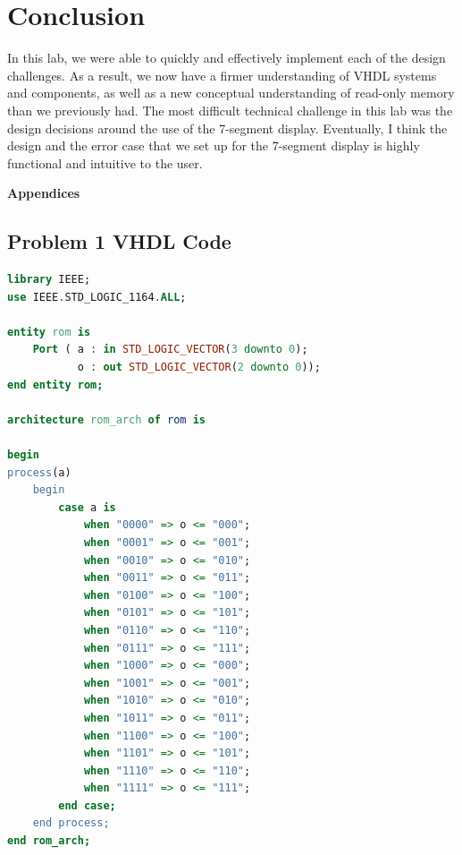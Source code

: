 \documentclass[11pt]{article}
\begin{document}
\section{Conclusion}
In this lab, we were able to quickly and effectively implement each of the design challenges. As a result, we now have a firmer understanding of VHDL systems and components, as well as a new conceptual understanding of read-only memory than we previously had. The most difficult technical challenge in this lab was the design decisions around the use of the 7-segment display. Eventually, I think the design and the error case that we set up for the 7-segment display is highly functional and intuitive to the user.

\pagebreak

\textbf{Appendices}

\begin{appendices}

\section{Problem 1 VHDL Code}

\begin{lstlisting}[language=VHDL]
library IEEE;
use IEEE.STD_LOGIC_1164.ALL;

entity rom is
    Port ( a : in STD_LOGIC_VECTOR(3 downto 0);
           o : out STD_LOGIC_VECTOR(2 downto 0));
end entity rom;

architecture rom_arch of rom is
    
begin
process(a)
    begin
        case a is
            when "0000" => o <= "000";
            when "0001" => o <= "001";
            when "0010" => o <= "010";
            when "0011" => o <= "011";
            when "0100" => o <= "100";
            when "0101" => o <= "101";
            when "0110" => o <= "110";
            when "0111" => o <= "111";
            when "1000" => o <= "000";
            when "1001" => o <= "001";
            when "1010" => o <= "010";
            when "1011" => o <= "011";
            when "1100" => o <= "100";
            when "1101" => o <= "101";
            when "1110" => o <= "110";
            when "1111" => o <= "111";
        end case;
    end process;
end rom_arch;
\end{lstlisting}


\end{appendices}
\end{document}
